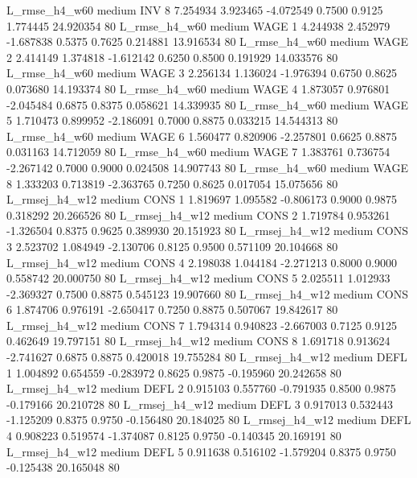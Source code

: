  L_rmse_h4_w60     medium      INV                 8  7.254934 3.923465 -4.072549 0.7500 0.9125  1.774445   24.920354 80
 L_rmse_h4_w60     medium     WAGE                 1  4.244938 2.452979 -1.687838 0.5375 0.7625  0.214881   13.916534 80
 L_rmse_h4_w60     medium     WAGE                 2  2.414149 1.374818 -1.612142 0.6250 0.8500  0.191929   14.033576 80
 L_rmse_h4_w60     medium     WAGE                 3  2.256134 1.136024 -1.976394 0.6750 0.8625  0.073680   14.193374 80
 L_rmse_h4_w60     medium     WAGE                 4  1.873057 0.976801 -2.045484 0.6875 0.8375  0.058621   14.339935 80
 L_rmse_h4_w60     medium     WAGE                 5  1.710473 0.899952 -2.186091 0.7000 0.8875  0.033215   14.544313 80
 L_rmse_h4_w60     medium     WAGE                 6  1.560477 0.820906 -2.257801 0.6625 0.8875  0.031163   14.712059 80
 L_rmse_h4_w60     medium     WAGE                 7  1.383761 0.736754 -2.267142 0.7000 0.9000  0.024508   14.907743 80
 L_rmse_h4_w60     medium     WAGE                 8  1.333203 0.713819 -2.363765 0.7250 0.8625  0.017054   15.075656 80
L_rmsej_h4_w12     medium     CONS                 1  1.819697 1.095582 -0.806173 0.9000 0.9875  0.318292   20.266526 80
L_rmsej_h4_w12     medium     CONS                 2  1.719784 0.953261 -1.326504 0.8375 0.9625  0.389930   20.151923 80
L_rmsej_h4_w12     medium     CONS                 3  2.523702 1.084949 -2.130706 0.8125 0.9500  0.571109   20.104668 80
L_rmsej_h4_w12     medium     CONS                 4  2.198038 1.044184 -2.271213 0.8000 0.9000  0.558742   20.000750 80
L_rmsej_h4_w12     medium     CONS                 5  2.025511 1.012933 -2.369327 0.7500 0.8875  0.545123   19.907660 80
L_rmsej_h4_w12     medium     CONS                 6  1.874706 0.976191 -2.650417 0.7250 0.8875  0.507067   19.842617 80
L_rmsej_h4_w12     medium     CONS                 7  1.794314 0.940823 -2.667003 0.7125 0.9125  0.462649   19.797151 80
L_rmsej_h4_w12     medium     CONS                 8  1.691718 0.913624 -2.741627 0.6875 0.8875  0.420018   19.755284 80
L_rmsej_h4_w12     medium     DEFL                 1  1.004892 0.654559 -0.283972 0.8625 0.9875 -0.195960   20.242658 80
L_rmsej_h4_w12     medium     DEFL                 2  0.915103 0.557760 -0.791935 0.8500 0.9875 -0.179166   20.210728 80
L_rmsej_h4_w12     medium     DEFL                 3  0.917013 0.532443 -1.125209 0.8375 0.9750 -0.156480   20.184025 80
L_rmsej_h4_w12     medium     DEFL                 4  0.908223 0.519574 -1.374087 0.8125 0.9750 -0.140345   20.169191 80
L_rmsej_h4_w12     medium     DEFL                 5  0.911638 0.516102 -1.579204 0.8375 0.9750 -0.125438   20.165048 80
